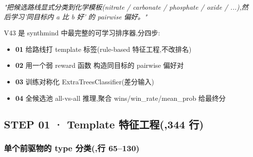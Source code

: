 \textit{"把候选路线显式分类到化学模板(nitrate / carbonate / phosphate / oxide / ...),然后学习'同目标内 a 比 b 好' 的 pairwise 偏好。"}

V43 是 synthmind 中最完整的可学习排序器,分四步:
\begin{itemize}
    \item \textbf{01} 给路线打 template 标签(rule-based 特征工程,不改排名)
    \item \textbf{02} 用一个弱 reward 函数  构造同目标的 pairwise 偏好对
    \item \textbf{03} 训练对称化 ExtraTreesClassifier(差分输入)
    \item \textbf{04} 全候选池 all-vs-all 推理,聚合 wins/win\_rate/mean\_prob 给最终分
\end{itemize}

\subsection{STEP 01 · Template 特征工程(,344 行)}

\subsubsection{单个前驱物的 type 分类(,行 65--130)}

